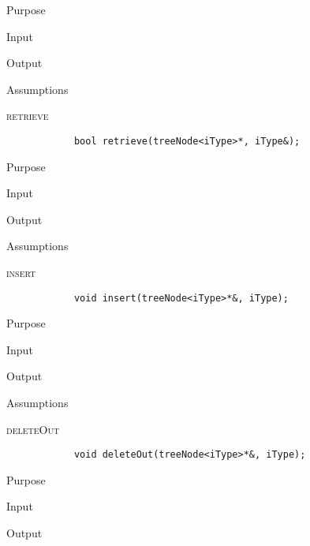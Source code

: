 \documentclass[pdftex, 12pt]{article}
\begin{document}
\begin{description}
\begin{description}
			\item{Purpose}

			\item{Input}

			\item{Output}

			\item{Assumptions}

		\end{description}
	\item{\textsc{retrieve}}
		\begin{lstlisting}
			bool retrieve(treeNode<iType>*, iType&);
		\end{lstlisting}
		\begin{description}

			\item{Purpose}

			\item{Input}

			\item{Output}

			\item{Assumptions}

		\end{description}
	\item{\textsc{insert}}
		\begin{lstlisting}
			void insert(treeNode<iType>*&, iType);
		\end{lstlisting}
		\begin{description}

			\item{Purpose}

			\item{Input}

			\item{Output}

			\item{Assumptions}

		\end{description}
	\item{\textsc{deleteOut}}
		\begin{lstlisting}
			void deleteOut(treeNode<iType>*&, iType);
		\end{lstlisting}
		\begin{description}

			\item{Purpose}

			\item{Input}

			\item{Output}


\end{description}
\end{description}
\end{document}

